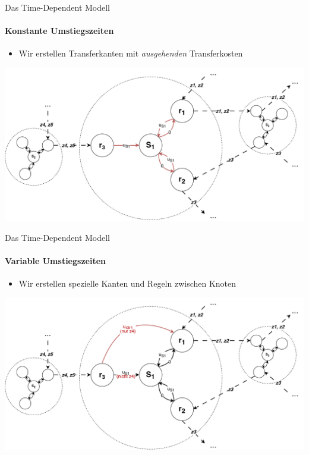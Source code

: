 \begin{frame}{Das Time-Dependent Modell}
	\framesubtitle{Konstante Umstiegszeiten}
	\begin{itemize}
		\item Wir erstellen Transferkanten mit \textit{ausgehenden} Transferkosten
	\end{itemize}

	\begin{center}
		\includegraphics[width=.90\linewidth]{images/time-dependent/model_1.pdf}
	\end{center}
\end{frame}


\begin{frame}{Das Time-Dependent Modell}
	\framesubtitle{Variable Umstiegszeiten}
	\begin{itemize}
		\item Wir erstellen spezielle Kanten und Regeln zwischen Knoten
	\end{itemize}

	\begin{center}
		\includegraphics[width=.90\linewidth]{images/time-dependent/model_2.pdf}
	\end{center}
\end{frame}

